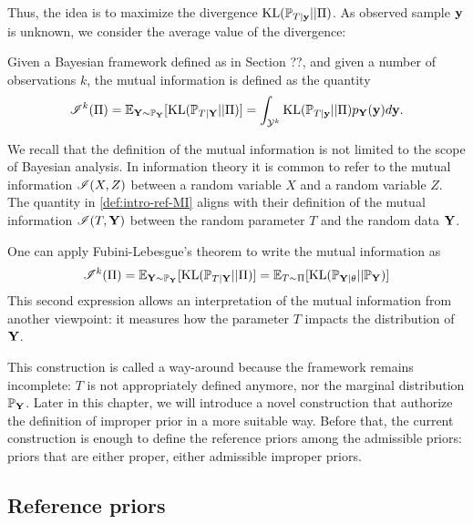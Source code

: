 Thus, the idea is to maximize the divergence $\text{KL}(\mathbb{P}_{T|\mathbf{y}}||\Pi)$. As observed sample $\mathbf{y}$ is unknown, we consider the average value of the divergence:
\begin{defi}\label{def:intro-ref-MI}
    Given a Bayesian framework defined as in Section ??, and given a number of observations $k$, the mutual information is defined as the quantity
    \begin{equation}
        \mathscr{I}^k(\Pi) =  \mathbb{E}_{\mathbf{Y}\sim \mathbb{P}_{\mathbf{Y}}}[\text{KL}(\mathbb{P}_{T|\mathbf{Y}}||\Pi)] =  \int_{\mathcal{Y}^k}\text{KL}(\mathbb{P}_{T|\mathbf{y}}||\Pi) p_{\mathbf{Y}}(\mathbf{y})d\mathbf{y}.
    \end{equation}
\end{defi}



We recall that the definition of the mutual information is not limited to the scope of Bayesian analysis. In information theory it is common to refer to the mutual information $\mathscr{I}(X,Z)$ between a random variable $X$ and a random variable $Z$. The quantity in \cref{def:intro-ref-MI} aligns with their definition of the mutual information $\mathscr{I}(T,\mathbf{Y})$ between the random parameter $T$ and the random data $\mathbf{Y}$.

One can apply Fubini-Lebesgue's theorem to write the mutual information as
\begin{equation}
    \mathscr{I}^k(\Pi) =  \mathbb{E}_{\mathbf{Y}\sim \mathbb{P}_{\mathbf{Y}}}[\text{KL}(\mathbb{P}_{T|\mathbf{Y}}||\Pi)] =  \mathbb{E}_{T\sim\Pi}[\text{KL}(\mathbb{P}_{\mathbf{Y}|\theta}||\mathbb{P}_{\mathbf{Y}}) ]
\end{equation}
This second expression allows an interpretation of the mutual information from another viewpoint: it measures how the parameter $T$ impacts the distribution of $\mathbf{Y}$.


This construction is called a way-around because the framework remains incomplete: $T$ is not appropriately defined anymore, nor the marginal distribution $\mathbb{P}_{\mathbf{Y}}$. Later in this chapter, we will introduce a novel construction that authorize the definition of improper prior in a more suitable way.
Before that, the current construction is enough to define the reference priors among the admissible priors: priors that are either proper, either admissible improper priors.







\subsection{Reference priors}

